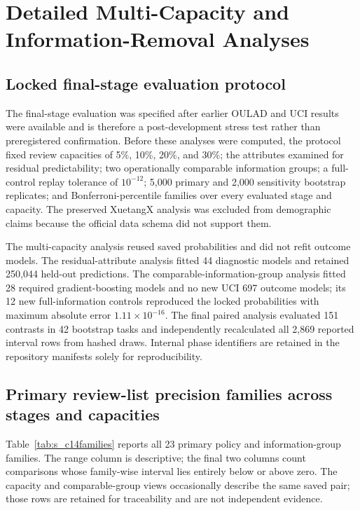 \documentclass[education,supfile,submit,moreauthors]{Definitions/mdpi}
\begin{document}
\section{Detailed Multi-Capacity and Information-Removal Analyses}

\subsection{Locked final-stage evaluation protocol}

The final-stage evaluation was specified after earlier OULAD and UCI results were available and is therefore a post-development stress test rather than preregistered confirmation. Before these analyses were computed, the protocol fixed review capacities of 5\%, 10\%, 20\%, and 30\%; the attributes examined for residual predictability; two operationally comparable information groups; a full-control replay tolerance of $10^{-12}$; 5,000 primary and 2,000 sensitivity bootstrap replicates; and Bonferroni-percentile families over every evaluated stage and capacity. The preserved XuetangX analysis was excluded from demographic claims because the official data schema did not support them.

The multi-capacity analysis reused saved probabilities and did not refit outcome models. The residual-attribute analysis fitted 44 diagnostic models and retained 250,044 held-out predictions. The comparable-information-group analysis fitted 28 required gradient-boosting models and no new UCI 697 outcome models; its 12 new full-information controls reproduced the locked probabilities with maximum absolute error $1.11\times10^{-16}$. The final paired analysis evaluated 151 contrasts in 42 bootstrap tasks and independently recalculated all 2,869 reported interval rows from hashed draws. Internal phase identifiers are retained in the repository manifests solely for reproducibility.

\subsection{Primary review-list precision families across stages and capacities}

Table~\ref{tab:s_c14families} reports all 23 primary policy and information-group families. The range column is descriptive; the final two columns count comparisons whose family-wise interval lies entirely below or above zero. The capacity and comparable-group views occasionally describe the same saved pair; those rows are retained for traceability and are not independent evidence.
\end{document}
